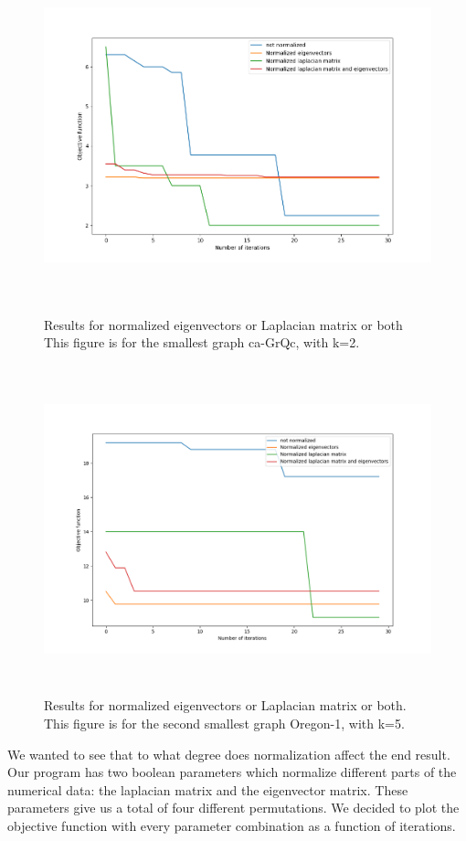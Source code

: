 \documentclass{article}
\begin{document}
\begin{figure}[htb]
\begin{center} 
\includegraphics[height=9.5cm]{normalization_plot.png}
\end{center}
\caption{Results for normalized eigenvectors or Laplacian matrix or both
This figure is for the smallest graph ca-GrQc, with k=2.}
\label{normalized}
\begin{center} 
	\includegraphics[height=9.5cm]{normalization_plot-oregonk5.png}
	\end{center}
	\caption{Results for normalized eigenvectors or Laplacian matrix or both.
	This figure is for the second smallest graph Oregon-1, with k=5.}
	\label{normalized2}
\end{figure}

\clearpage
We wanted to see that to what degree does normalization affect the end result.
Our program has two boolean parameters which normalize different parts of the numerical
data: the laplacian matrix and the eigenvector matrix. These parameters give us a total of 
four different permutations. We decided to plot the objective function with every parameter 
combination as a function of iterations. 
\end{document}
